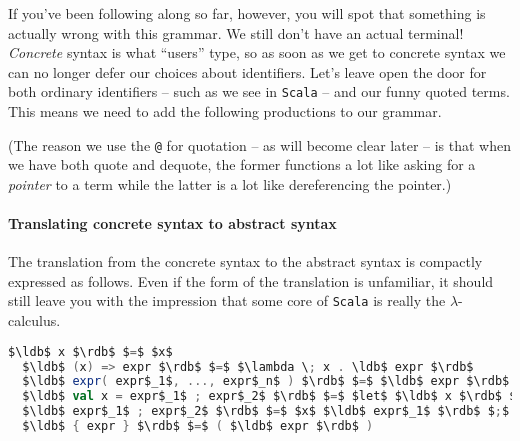 If you've been following along so far, however, you will spot that
something is actually wrong with this grammar. We still don't have an
actual terminal! \emph{Concrete} syntax is what ``users'' type, so as
soon as we get to concrete syntax we can no longer defer our choices
about identifiers. Let's leave open the door for both ordinary
identifiers -- such as we see in \texttt{Scala} -- and our funny
quoted terms. This means we need to add the following productions to
our grammar.


(The reason we use the \texttt{@} for quotation -- as will become
clear later -- is that when we have both quote and dequote, the former
functions a lot like asking for a \emph{pointer} to a term while the
latter is a lot like dereferencing the pointer.)

\paragraph{Translating concrete syntax to abstract syntax}
The translation from the concrete syntax to the abstract syntax is
compactly expressed as follows. Even if the form of the translation is
unfamiliar, it should still leave you with the impression that some
core of \texttt{Scala} is really the $\lambda$-calculus.


\begin{lstlisting}[language=Scala,mathescape=true]
  $\ldb$ x $\rdb$ $=$ $x$
  $\ldb$ (x) => expr $\rdb$ $=$ $\lambda \; x . \ldb$ expr $\rdb$ 
  $\ldb$ expr( expr$_1$, ..., expr$_n$ ) $\rdb$ $=$ $\ldb$ expr $\rdb$ $\ldb$ expr$_1$ $\rdb$ ... $\ldb$ expr$n$ $\rdb$
  $\ldb$ val x = expr$_1$ ; expr$_2$ $\rdb$ $=$ $let$ $\ldb$ x $\rdb$ $=$ $\ldb$ expr$_1$ $\rdb$ $in$ $\ldb$ expr$_2$ $\rdb$
  $\ldb$ expr$_1$ ; expr$_2$ $\rdb$ $=$ $x$ $\ldb$ expr$_1$ $\rdb$ $;$ $\ldb$ expr$_2$ $\rdb$
  $\ldb$ { expr } $\rdb$ $=$ ( $\ldb$ expr $\rdb$ )
\end{lstlisting}

